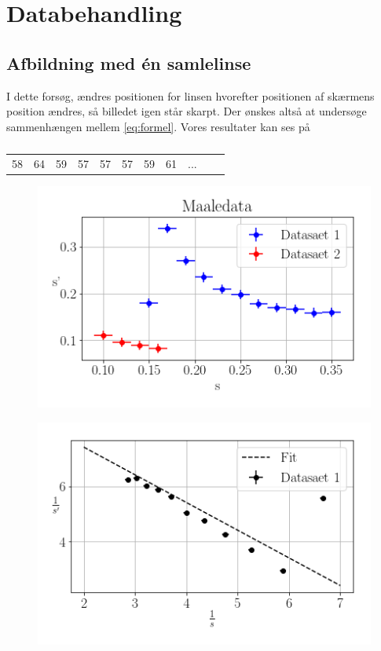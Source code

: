 \section{Databehandling}
\subsection{Afbildning med én samlelinse}
I dette forsøg, ændres positionen for linsen hvorefter positionen af skærmens position ændres, så billedet igen står skarpt. Der ønskes altså at undersøge sammenhængen mellem \cref{eq:formel}.
Vores resultater kan ses på
\begin{table}[H]
    \begin{tabular}{c|c|c|c|c|c|c|c|c|c|c}
        58 &  64 &  59 &  57 &  57 &  57  & 59  & 61  & ...
    \end{tabular}
    \caption{}
    \label{}
\end{table}
\begin{figure}[H]
    \includegraphics[width=\linewidth]{usikkerhed.png}
    \caption{}
    \label{fig:usikkerhed}
\end{figure}

\begin{figure}[H]
    \includegraphics[width=\linewidth]{1.png}
    \caption{}
    \label{fig:1}
\end{figure}

